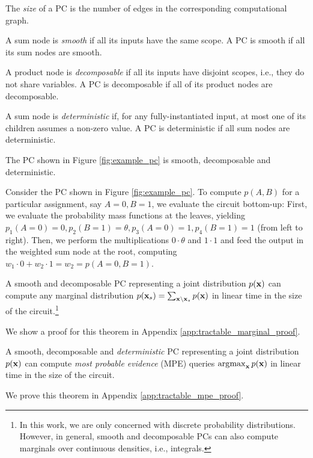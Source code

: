 \begin{definition}[Size]
    The \textit{size} of a PC is the number of edges in the corresponding computational graph.
\end{definition}
\begin{definition}[Smoothness]
    A sum node is \textit{smooth} if all its inputs have the same scope. A PC is smooth if all its sum nodes are smooth.
\end{definition}
\begin{definition}[Decomposability]
    A product node is \textit{decomposable} if all its inputs have disjoint scopes, i.e., they do not share variables. A PC is decomposable if all of its product nodes are decomposable.
\end{definition}
\begin{definition}[Determinism]
    A sum node is \textit{deterministic} if, for any fully-instantiated input, at most one of its children assumes a non-zero value. A PC is deterministic if all sum nodes are deterministic.
\end{definition}

The PC shown in Figure \ref{fig:example_pc} is smooth, decomposable and deterministic. 

Consider the PC shown in Figure \ref{fig:example_pc}. To compute $p(A,B)$ for a particular assignment, say $A=0, B=1$, we evaluate the circuit bottom-up: First, we evaluate the probability mass functions at the leaves, yielding $p_1(A=0) = 0, p_2(B=1)=\theta, p_3(A=0)=1, p_4(B=1)=1$ (from left to right). Then, we perform the multiplications $0 \cdot \theta$ and $1 \cdot 1$ and feed the output in the weighted sum node at the root, computing $w_1 \cdot 0 + w_2 \cdot 1 = w_2 = p(A=0, B=1)$.

\begin{theorem}
\label{theorem:tractable_marginal}
    A smooth and decomposable PC representing a joint distribution $p(\mathbf{x})$ can compute any marginal distribution $p(\mathbf{x}_s) = \sum_{\mathbf{x} \setminus \mathbf{x}_s} p(\mathbf{x})$ in linear time in the size of the circuit.\footnote{In this work, we are only concerned with discrete probability distributions. However, in general, smooth and decomposable PCs can also compute marginals over continuous densities, i.e., integrals.}
\end{theorem}
We show a proof for this theorem in Appendix \ref{app:tractable_marginal_proof}.

\begin{theorem}
\label{theorem:tractable_mpe}
    A smooth, decomposable and \textit{deterministic} PC representing a joint distribution $p(\mathbf{x})$ can compute \textit{most probable evidence} (MPE) queries $\operatorname*{\arg\!\max}_{\mathbf{x}} p(\mathbf{x})$ in linear time in the size of the circuit.
\end{theorem}
We prove this theorem in Appendix \ref{app:tractable_mpe_proof}.

